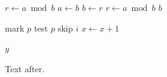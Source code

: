 \documentclass{article}
\begin{document}
\begin{algorithmic}[1]
    \State $r \gets a \bmod b$
      \State $a \gets b$
      \State $b \gets r$
      \State $r \gets a \bmod b$
    \EndWhile
    \State \Return $b$
  \EndProcedure
\end{algorithmic}

\begin{algorithmic}
      \State mark $p$
      \State test $p$
    \Else
       \State skip $i$ \EndFor
    \EndIf
  \EndFor
  \Repeat
    \State $x \gets x + 1$
\end{algorithmic}

\begin{algorithmic}
    \State $y$
\end{algorithmic}
Text after.
\end{document}
